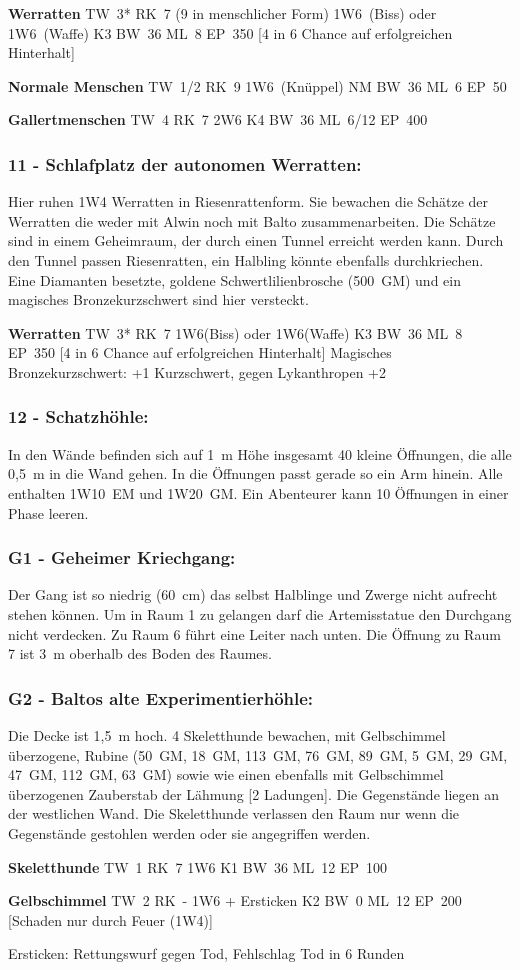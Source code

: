 \textbf{Werratten} TW~3* RK~7 (9 in menschlicher Form) 1W6~(Biss) oder 1W6~(Waffe)
K3 BW~36 ML~8 EP~350 [4 in 6 Chance auf erfolgreichen Hinterhalt]

\textbf{Normale Menschen} TW~1/2 RK~9 1W6~(Knüppel) NM BW~36 ML~6 EP~50

\textbf{Gallertmenschen} TW~4 RK~7 2W6 K4 BW~36 ML~6/12 EP~400

\subsubsection{11 - Schlafplatz der autonomen Werratten:} Hier ruhen 1W4 Werratten in
Riesenrattenform. Sie bewachen die Schätze der Werratten die weder
mit Alwin noch mit Balto zusammenarbeiten. Die Schätze sind in einem
Geheimraum, der durch einen Tunnel erreicht werden kann. Durch den Tunnel
passen Riesenratten, ein Halbling könnte ebenfalls durchkriechen. Eine
Diamanten besetzte, goldene Schwertlilienbrosche (500~GM) und ein
magisches Bronzekurzschwert sind hier versteckt.

\textbf{Werratten} TW~3* RK~7 1W6(Biss) oder 1W6(Waffe) K3 BW~36 ML~8 EP~350 [4 in 6 Chance auf
erfolgreichen Hinterhalt] Magisches Bronzekurzschwert: +1 Kurzschwert,
gegen Lykanthropen +2

\subsubsection{12 - Schatzhöhle:} In den Wände befinden sich auf 1~m Höhe insgesamt 40
kleine Öffnungen, die alle 0,5~m in die Wand gehen. In die Öffnungen
passt gerade so ein Arm hinein. Alle enthalten 1W10~EM und 1W20~GM. Ein
Abenteurer kann 10 Öffnungen in einer Phase leeren.

\subsubsection{G1 - Geheimer Kriechgang:} Der Gang ist so niedrig (60~cm) das selbst
Halblinge und Zwerge nicht aufrecht stehen können. Um in Raum 1 zu
gelangen darf die Artemisstatue den Durchgang nicht verdecken. Zu Raum
6 führt eine Leiter nach unten. Die Öffnung zu Raum 7 ist 3~m oberhalb
des Boden des Raumes.

\subsubsection{G2 - Baltos alte Experimentierhöhle:} Die Decke ist 1,5~m hoch. 4
Skeletthunde bewachen, mit Gelbschimmel überzogene, Rubine (50~GM, 18~GM,
113~GM, 76~GM, 89~GM, 5~GM, 29~GM, 47~GM, 112~GM, 63~GM) sowie wie einen ebenfalls
mit Gelbschimmel überzogenen Zauberstab der Lähmung [2 Ladungen]. Die
Gegenstände liegen an der westlichen Wand. Die Skeletthunde verlassen
den Raum nur wenn die Gegenstände gestohlen werden oder sie angegriffen
werden.

\textbf{Skeletthunde} TW~1 RK~7  1W6 K1 BW~36 ML~12 EP~100

\textbf{Gelbschimmel} TW~2 RK~- 1W6 + Ersticken K2 BW~0 ML~12 EP~200 [Schaden nur durch Feuer (1W4)]

Ersticken: Rettungswurf gegen Tod, Fehlschlag Tod in 6 Runden


